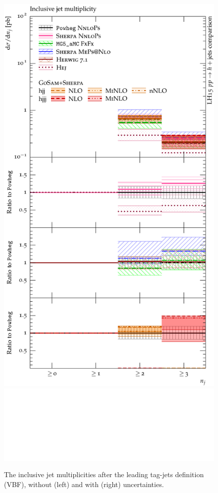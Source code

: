 \begin{figure}[t!]
\begin{minipage}{0.47\textwidth}
    \includegraphics[width=\textwidth]{figures/hjetscomp_NJet_incl_30_VBF.pdf}\\
    \includegraphics[width=\textwidth]{figures/ratiopanelplaceholder.pdf}
  \end{minipage}
  \caption{
    The inclusive jet multiplicities after the leading tag-jets definition (VBF), without
(left) and with (right) uncertainties.  
    \label{fig:hjetscomp:results:inclobs:njets_VBF}
  }
\end{figure}

